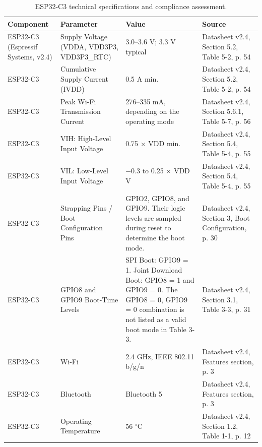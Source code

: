 \documentclass[lettersize,journal]{IEEEtran}
\begin{document}
\begin{table}[ht]
	\centering
	\caption{ESP32-C3 technical specifications and compliance assessment.}
	\label{tab:esp32c3}
	\scriptsize
	\renewcommand{\arraystretch}{1.2}
	\begin{tabular}{|p{1.4cm}|p{1.8cm}|p{1.8cm}|p{1.8cm}|}
		\hline
		\textbf{Component} &
		\textbf{Parameter} &
		\textbf{Value} &
		\textbf{Source}\\
		\hline
		
		ESP32-C3
		(Espressif Systems, v2.4) &
		Supply Voltage (VDDA, VDD3P3, VDD3P3\_RTC) &
		3.0--3.6 V; 3.3 V typical &
		Datasheet v2.4, Section 5.2, Table 5-2, p. 54 \\
		\hline
		
		ESP32-C3 &
		Cumulative Supply Current (IVDD) &
		0.5 A min. &
		Datasheet v2.4, Section 5.2, Table 5-2, p. 54\\
		\hline
		
		ESP32-C3 &
		Peak Wi-Fi Transmission Current &
		276--335 mA, depending on the operating mode &
		Datasheet v2.4, Section 5.6.1, Table 5-7, p. 56\\
		\hline
		
		ESP32-C3 &
		VIH: High-Level Input Voltage &
		0.75 $\times$ VDD min. &
		Datasheet v2.4, Section 5.4, Table 5-4, p. 55\\
		\hline
		
		ESP32-C3 &
		VIL: Low-Level Input Voltage &
		$-0.3$ to 0.25 $\times$ VDD V &
		Datasheet v2.4, Section 5.4, Table 5-4, p. 55\\
		\hline
		
		ESP32-C3 &
		Strapping Pins / Boot Configuration Pins &
		GPIO2, GPIO8, and GPIO9. Their logic levels are sampled during reset to determine the boot mode. &
		Datasheet v2.4, Section 3, Boot Configuration, p. 30 \\
		\hline
		
		ESP32-C3 &
		GPIO8 and GPIO9 Boot-Time Levels &
		SPI Boot: GPIO9 = 1. Joint Download Boot: GPIO8 = 1 and GPIO9 = 0. The GPIO8 = 0, GPIO9 = 0 combination is not listed as a valid boot mode in Table 3-3. &
		Datasheet v2.4, Section 3.1, Table 3-3, p. 31\\
		\hline
		
		ESP32-C3 &
		Wi-Fi &
		2.4 GHz, IEEE 802.11 b/g/n &
		Datasheet v2.4, Features section, p. 3\\
		\hline
		
		ESP32-C3 &
		Bluetooth &
		Bluetooth 5 &
		Datasheet v2.4, Features section, p. 3 \\
		\hline
		
		ESP32-C3 &
		Operating Temperature &
		56 $^\circ$C &
		Datasheet v2.4, Section 1.2, Table 1-1, p. 12\\
		\hline
		
	\end{tabular}
\end{table}
\end{document}
